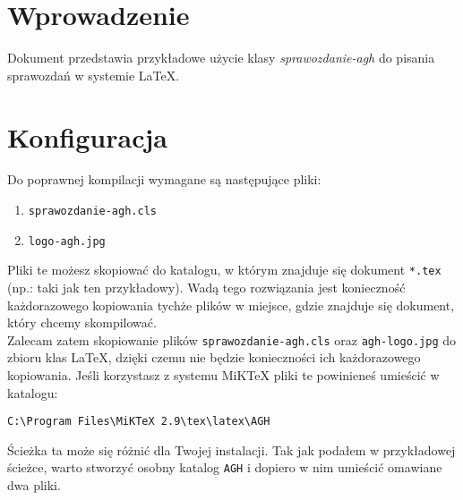 \documentclass{sprawozdanie-agh}
\begin{document}

\stronatytulowa{}

\section{Wprowadzenie}

Dokument przedstawia przykładowe użycie klasy \emph{sprawozdanie-agh} do pisania sprawozdań w systemie \LaTeX.

\section{Konfiguracja}

Do poprawnej kompilacji wymagane są następujące pliki:
\begin{enumerate}
\item \texttt{sprawozdanie-agh.cls}
\item \texttt{logo-agh.jpg}
\end{enumerate}

Pliki te możesz skopiować do katalogu, w którym znajduje się dokument \texttt{*.tex} (np.: taki jak ten przykładowy). Wadą tego rozwiązania jest konieczność każdorazowego kopiowania tychże plików w miejsce, gdzie znajduje się dokument, który chcemy skompilować.\\
Zalecam zatem skopiowanie plików \texttt{sprawozdanie-agh.cls} oraz \texttt{agh-logo.jpg} do zbioru klas \LaTeX, dzięki czemu nie będzie konieczności ich każdorazowego kopiowania. Jeśli korzystasz z systemu MiKTeX pliki te powinieneś umieścić w katalogu:
\begin{lstlisting}
C:\Program Files\MiKTeX 2.9\tex\latex\AGH
\end{lstlisting}
Ścieżka ta może się różnić dla Twojej instalacji. Tak jak podałem w przykładowej ścieżce, warto stworzyć osobny katalog \texttt{AGH} i dopiero w nim umieścić omawiane dwa pliki.
\end{document}
